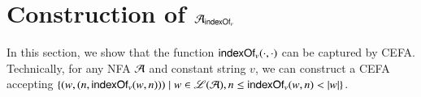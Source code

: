 

%





\section{Construction of $\mathcal{A}_{\mathsf{indexOf}_v}$} \label{appendix:cefa_indexof}

In this section, we show that the function $\mathsf{indexOf}_v(\cdot, \cdot)$ can be captured by CEFA. Technically, for any NFA $\mathcal{A}$ and constant string $v$, we can construct a CEFA accepting $\{(w, (n, \mathsf{indexOf}_v(w, n)))\mid w\in \mathscr{L}(\mathcal{A}), n \le \mathsf{indexOf}_v(w, n) < |w| \}$. 

